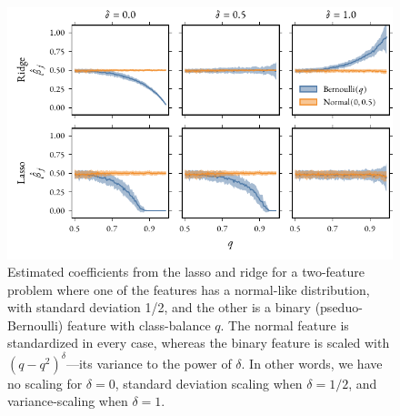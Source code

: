 \begin{figure}[htpb]
  \centering
  \includegraphics[]{figures/mixed_data_thesis.pdf}
  \caption{%
    Estimated coefficients from the lasso and ridge for a two-feature problem where one of the features has a normal-like distribution, with standard deviation 1/2, and the other is a binary (pseduo-Bernoulli) feature with class-balance \(q\). The normal feature is standardized in every case, whereas the binary feature is scaled with \((q - q^2)^\delta\)---its variance to the power of \(\delta\). In other words, we have no scaling for \(\delta=0\), standard deviation scaling when \(\delta=1/2\), and variance-scaling when \(\delta = 1\).
  }
  \label{fig:paper6-highlight}
\end{figure}
